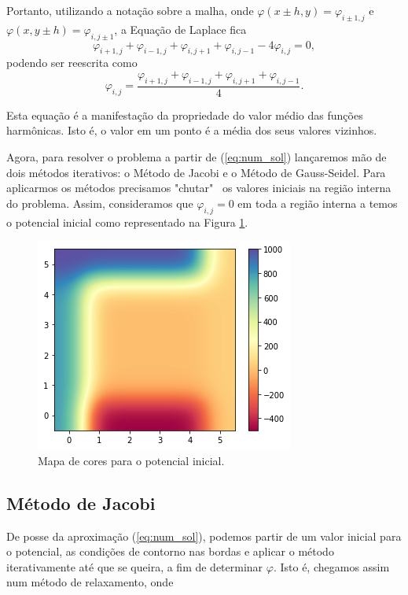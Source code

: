 \documentclass[a4paper,12pt]{article}
\begin{document}
Portanto, utilizando a notação sobre a malha, onde $\varphi(x\pm h, y)=\varphi_{i\pm 1,j}$ e $\varphi(x,y\pm h)=\varphi_{i,j\pm 1}$, a Equação de Laplace fica
\begin{equation*}
  \varphi_{i+1, j}+\varphi_{i-1,j}+\varphi_{i,j+1}+\varphi_{i,j-1}-4\varphi_{i,j}=0,
\end{equation*}
podendo ser reescrita como
\begin{equation}
  \varphi_{i,j} = \frac{\varphi_{i+1,j}+\varphi_{i-1,j}+\varphi_{i,j+1}+\varphi_{i,j-1}}{4}.
  \label{eq:num_sol}
\end{equation}

Esta equação é a manifestação da propriedade do valor médio das funções harmônicas. Isto é, o valor em um ponto é a média dos seus valores vizinhos.

Agora, para resolver o problema a partir de (\ref{eq:num_sol}) lançaremos mão de dois métodos iterativos: o Método de Jacobi e o Método de Gauss-Seidel. Para aplicarmos os métodos precisamos "chutar" \ os valores iniciais na região interna do problema. Assim, consideramos que $\varphi_{i, j}=0$ em toda a região interna a temos o potencial inicial como representado na Figura \ref{fig:initial}.

\begin{figure}[H]
\centering
\includegraphics[scale=0.7]{img/initial_potential}
  \caption{Mapa de cores para o potencial inicial.}
  \label{fig:initial}
\end{figure}

\subsection*{Método de Jacobi}

De posse da aproximação (\ref{eq:num_sol}), podemos partir de um valor inicial para o potencial, as condições de contorno nas bordas e aplicar o método iterativamente até que se queira, a fim de determinar $\varphi$. Isto é, chegamos assim num método de relaxamento, onde
\end{document}
